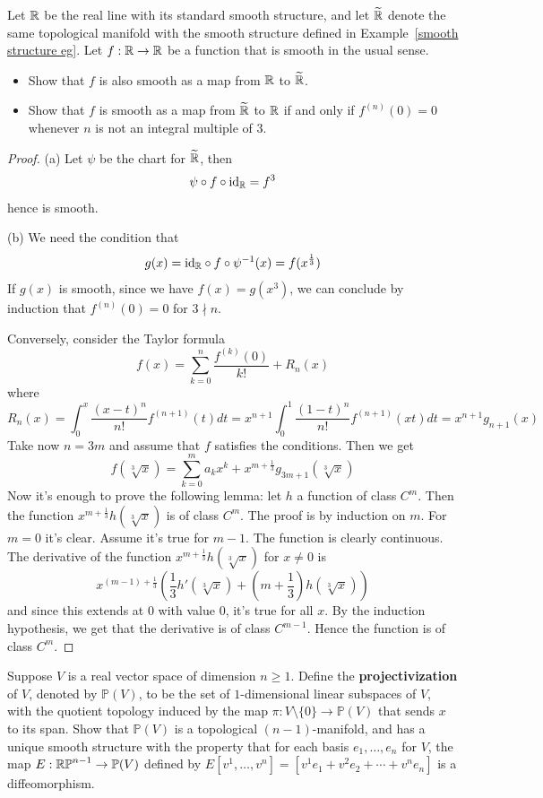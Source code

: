 \begin{exercise}
Let $\mathbb{R}$ be the real line with its standard smooth structure, and let $\widetilde{\mathbb{R}}$ denote the same topological manifold with the smooth structure defined in Example~\ref{smooth structure eg}. Let $f:\mathbb{R}\to\mathbb{R}$ be a function that is smooth in the usual sense.
\begin{itemize}
\item[(a)]Show that $f$ is also smooth as a map from $\mathbb{R}$ to $\widetilde{\mathbb{R}}$.
\item[(b)]Show that $f$ is smooth as a map from $\widetilde{\mathbb{R}}$ to $\mathbb{R}$ if and only if $f^{(n)}(0)=0$ whenever $n$ is not an integral multiple of $3$.
\end{itemize}
\end{exercise}
\begin{proof}
(a) Let $\psi$ be the chart for $\widetilde{\mathbb{R}}$, then
\[\psi\circ f\circ\mathrm{id}_{\mathbb{R}}=f^3\]
hence is smooth.\par
(b) We need the condition that
\[g(x)=\mathrm{id}_{\mathbb{R}}\circ f\circ \psi^{-1}(x)=f(x^{\frac{1}{3}})\]
If $g(x)$ is smooth, since we have $f(x)=g(x^3)$, we can conclude by induction that $f^{(n)}(0)=0$ for $3\nmid n$.\par
Conversely, consider the Taylor formula
\[f(x)=\sum_{k=0}^{n}\frac{f^{(k)}(0)}{k!}+R_n(x)\]
where
\[R_n(x)=\int_{0}^x\frac{(x-t)^n}{n!}f^{(n+1)}(t)dt=x^{n+1} \int_0^1\frac{(1-t)^n}{n!}f^{(n+1)}(xt)dt=x^{n+1}g_{n+1}(x)\]
Take now $n=3m$ and assume that $f$ satisfies the conditions. Then we get
\[f(\sqrt[3]{x})=\sum_{k=0}^ma_kx^k+x^{m+\frac{1}{3}}g_{3m+1}(\sqrt[3]{x})\]
Now it's enough to prove the following lemma: let $h$ a function of class $C^m$. Then the function $x^{m+\frac{1}{3}}h(\sqrt[3]{x})$ is of class $C^m$. The proof is by induction on $m$. For $m=0$ it's clear. Assume it's true for $m-1$. The function is clearly continuous. The derivative of the function $x^{m+\frac{1}{3}} h(\sqrt[3]{x})$ for $x\ne 0$ is 
$$x^{(m-1) +\frac{1}{3}} \left(\frac{1}{3}h'(\sqrt[3]{x}) + (m+\frac{1}{3})h( \sqrt[3]{x}) \right )$$ and since this extends at $0$ with value $0$, it's true for all $x$. By the induction hypothesis, we get that the derivative is of class $C^{m-1}$. Hence the function is of class $C^m$.
\end{proof}
\begin{exercise}
Suppose $V$ is a real vector space of dimension $n\geq1$. Define the \textbf{projectivization} of $V$, denoted by $\mathbb{P}(V)$, to be the set of $1$-dimensional linear subspaces of $V$, with the quotient topology induced by the map $\pi:V\setminus\{0\}\to\mathbb{P}(V)$ that sends $x$ to its span. Show that $\mathbb{P}(V)$ is a topological $(n-1)$-manifold, and has a unique smooth structure with the property that for each basis $e_1,\dots,e_n$ for $V$, the map $E:\mathbb{RP}^{n-1}\to\mathbb{P}(V)$ defined by $E[v^1,\dots,v^n]=[v^1e_1+v^2e_2+\cdots+v^ne_n]$ is a diffeomorphism.
\end{exercise}
